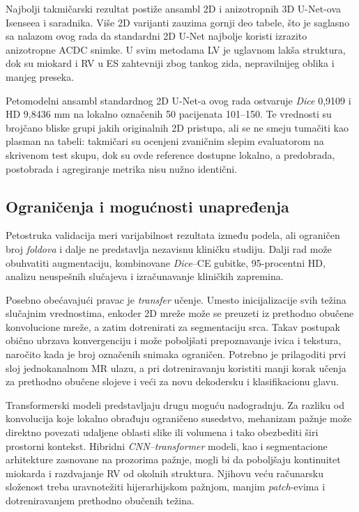 \documentclass[11pt,a4paper]{article}
\begin{document}
Najbolji takmičarski rezultat postiže ansambl 2D i anizotropnih 3D U-Net-ova Isenseea i saradnika.
Više 2D varijanti zauzima gornji deo tabele, što je saglasno sa nalazom ovog rada da standardni 2D
U-Net najbolje koristi izrazito anizotropne ACDC snimke. U svim metodama LV je uglavnom lakša
struktura, dok su miokard i RV u ES zahtevniji zbog tankog zida, nepravilnijeg oblika i manjeg
preseka.

Petomodelni ansambl standardnog 2D U-Net-a ovog rada ostvaruje \textit{Dice} 0,9109 i HD 9,8436 mm na
lokalno označenih 50 pacijenata 101--150. Te vrednosti su brojčano bliske grupi jakih originalnih
2D pristupa, ali se ne smeju tumačiti kao plasman na tabeli: takmičari su ocenjeni zvaničnim slepim
evaluatorom na skrivenom test skupu, dok su ovde reference dostupne lokalno, a predobrada,
postobrada i agregiranje metrika nisu nužno identični.

\subsection{Ograničenja i mogućnosti unapređenja}
Petostruka validacija meri varijabilnost rezultata između podela, ali ograničen broj \textit{foldova} i
dalje ne predstavlja nezavisnu kliničku studiju. Dalji rad može obuhvatiti augmentaciju,
kombinovane \textit{Dice}--CE gubitke, 95-procentni HD, analizu neuspešnih slučajeva i izračunavanje
kliničkih zapremina.

Posebno obećavajući pravac je \textit{transfer} učenje. Umesto inicijalizacije svih težina slučajnim
vrednostima, enkoder 2D mreže može se preuzeti iz prethodno obučene konvolucione mreže, a zatim
dotrenirati za segmentaciju srca. Takav postupak obično ubrzava konvergenciju i može poboljšati
prepoznavanje ivica i tekstura, naročito kada je broj označenih snimaka ograničen. Potrebno je
prilagoditi prvi sloj jednokanalnom MR ulazu, a pri dotreniravanju koristiti manji korak učenja za
prethodno obučene slojeve i veći za novu dekodersku i klasifikacionu glavu.

Transformerski modeli predstavljaju drugu moguću nadogradnju. Za razliku od konvolucija koje
lokalno obrađuju ograničeno susedstvo, mehanizam pažnje može direktno povezati udaljene oblasti
slike ili volumena i tako obezbediti širi prostorni kontekst. Hibridni \textit{CNN--transformer} modeli, kao
i segmentacione arhitekture zasnovane na prozorima pažnje, mogli bi da poboljšaju kontinuitet
miokarda i razdvajanje RV od okolnih struktura. Njihovu veću računarsku složenost treba
uravnotežiti hijerarhijskom pažnjom, manjim \textit{patch}-evima i dotreniravanjem prethodno obučenih
težina.
\end{document}

